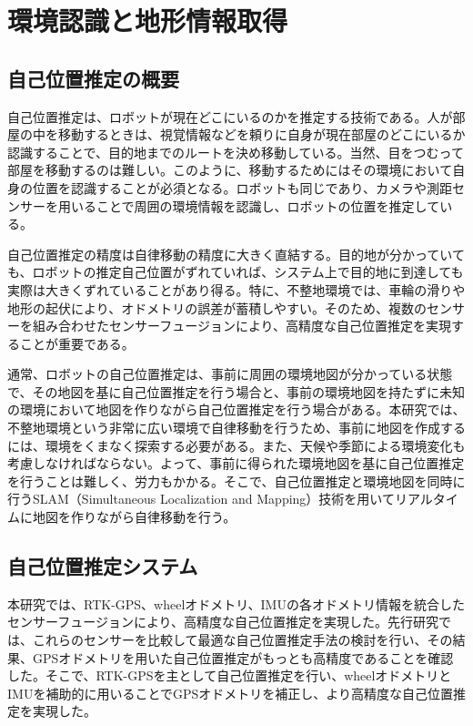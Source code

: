 \chapter{環境認識と地形情報取得}

\section{自己位置推定の概要}

自己位置推定は、ロボットが現在どこにいるのかを推定する技術である。人が部屋の中を移動するときは、視覚情報などを頼りに自身が現在部屋のどこにいるか認識することで、目的地までのルートを決め移動している。当然、目をつむって部屋を移動するのは難しい。このように、移動するためにはその環境において自身の位置を認識することが必須となる。ロボットも同じであり、カメラや測距センサーを用いることで周囲の環境情報を認識し、ロボットの位置を推定している。

自己位置推定の精度は自律移動の精度に大きく直結する。目的地が分かっていても、ロボットの推定自己位置がずれていれば、システム上で目的地に到達しても実際は大きくずれていることがあり得る。特に、不整地環境では、車輪の滑りや地形の起伏により、オドメトリの誤差が蓄積しやすい。そのため、複数のセンサーを組み合わせたセンサーフュージョンにより、高精度な自己位置推定を実現することが重要である。

通常、ロボットの自己位置推定は、事前に周囲の環境地図が分かっている状態で、その地図を基に自己位置推定を行う場合と、事前の環境地図を持たずに未知の環境において地図を作りながら自己位置推定を行う場合がある。本研究では、不整地環境という非常に広い環境で自律移動を行うため、事前に地図を作成するには、環境をくまなく探索する必要がある。また、天候や季節による環境変化も考慮しなければならない。よって、事前に得られた環境地図を基に自己位置推定を行うことは難しく、労力もかかる。そこで、自己位置推定と環境地図を同時に行うSLAM（Simultaneous Localization and Mapping）技術を用いてリアルタイムに地図を作りながら自律移動を行う。

\section{自己位置推定システム}

本研究では、RTK-GPS、wheelオドメトリ、IMUの各オドメトリ情報を統合したセンサーフュージョンにより、高精度な自己位置推定を実現した。先行研究では、これらのセンサーを比較して最適な自己位置推定手法の検討を行い、その結果、GPSオドメトリを用いた自己位置推定がもっとも高精度であることを確認した。そこで、RTK-GPSを主として自己位置推定を行い、wheelオドメトリとIMUを補助的に用いることでGPSオドメトリを補正し、より高精度な自己位置推定を実現した。

